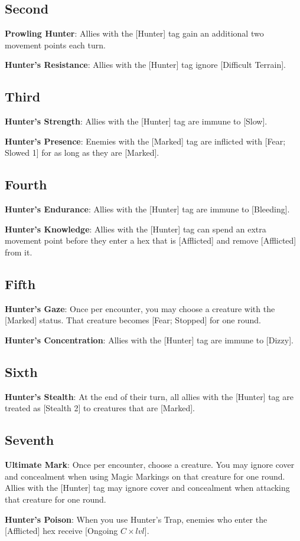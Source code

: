 \begin{multicols*}{2}
\subsection*{Second \Facet\perk}
\textbf{Prowling Hunter}: Allies with the [Hunter] tag gain an additional two movement points each turn. 

\textbf{Hunter’s Resistance}: Allies with the [Hunter] tag ignore [Difficult Terrain].

\subsection*{Third \Facet\perk}
\textbf{Hunter’s Strength}: Allies with the [Hunter] tag are immune to [Slow].

\textbf{Hunter’s Presence}: Enemies with the [Marked] tag are inflicted with [Fear; Slowed 1] for as long as they are [Marked].

\subsection*{Fourth \Facet\perk}
\textbf{Hunter’s Endurance}: Allies with the [Hunter] tag are immune to [Bleeding].

\textbf{Hunter’s Knowledge}: Allies with the [Hunter] tag can spend an extra movement point before they enter a hex that is [Afflicted] and remove [Afflicted] from it.

\subsection*{Fifth \Facet\perk}
\textbf{Hunter’s Gaze}: Once per encounter, you may choose a creature with the [Marked] status. That creature becomes [Fear; Stopped] for one round.

\textbf{Hunter’s Concentration}: Allies with the [Hunter] tag are immune to [Dizzy].

\subsection*{Sixth \Facet}
\textbf{Hunter’s Stealth}: At the end of their turn, all allies with the [Hunter] tag are treated as [Stealth 2] to creatures that are [Marked]. 

\subsection*{Seventh \Facet\perk}
\textbf{Ultimate Mark}: Once per encounter, choose a creature. You may ignore cover and concealment when using Magic Markings on that creature for one round. Allies with the [Hunter] tag may ignore cover and concealment when attacking that creature for one round.

\textbf{Hunter’s Poison}: When you use Hunter’s Trap, enemies who enter the [Afflicted] hex receive [Ongoing $C\times lvl$].

\end{multicols*}
